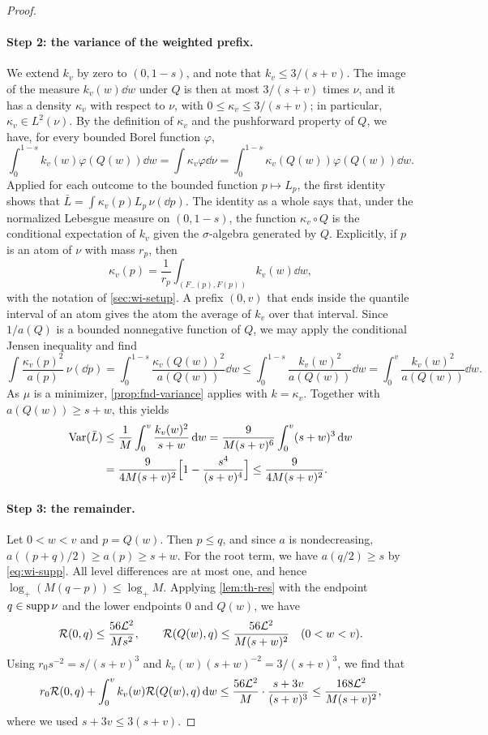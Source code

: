 \begin{proof}
\paragraph{Step 2: the variance of the weighted prefix.}
We extend $k_v$ by zero to $(0,1-s)$, and note that $k_v\le3/(s+v)$.
The image of the measure $k_v(w)\dd w$ under $Q$ is then at most
$3/(s+v)$ times $\nu$, and it has a density $\kappa_v$ with respect to
$\nu$, with $0\le\kappa_v\le3/(s+v)$; in particular,
$\kappa_v\in L^2(\nu)$. By the definition of $\kappa_v$ and the pushforward property of $Q$, we have,
for every bounded Borel function $\varphi$,
\[
 \int_0^{1-s}k_v(w)\varphi(Q(w))\dd w=\int\kappa_v\varphi\dd\nu
 =\int_0^{1-s}\kappa_v(Q(w))\varphi(Q(w))\dd w .
\]
Applied for each outcome to the bounded function $p\mapsto L_p$, the
first identity shows that $\bar L=\int\kappa_v(p)L_p\,\nu(\dd p)$. The identity as a whole says
that, under the normalized Lebesgue measure on $(0,1-s)$, the function
$\kappa_v\circ Q$ is the conditional expectation of $k_v$ given the
$\sigma$-algebra generated by $Q$. Explicitly, if $p$ is an atom of
$\nu$ with mass $r_p$, then
\[
 \kappa_v(p)=\frac1{r_p}\int_{(F_-(p),F(p))}k_v(w)\dd w,
\]
with the notation of \cref{sec:wi-setup}. A prefix $(0,v)$ that ends
inside the quantile interval of an atom gives the atom the average
of $k_v$ over that interval. Since $1/a(Q)$ is a bounded nonnegative
function of $Q$, we may apply the conditional Jensen inequality and find
\[
 \int\frac{\kappa_v(p)^2}{a(p)}\,\nu(\dd p)
 =\int_0^{1-s}\frac{\kappa_v(Q(w))^2}{a(Q(w))}\dd w
 \le\int_0^{1-s}\frac{k_v(w)^2}{a(Q(w))}\dd w
 =\int_0^v\frac{k_v(w)^2}{a(Q(w))}\dd w .
\]
As $\mu$ is a minimizer, \cref{prop:fnd-variance} applies with
$k=\kappa_v$. Together with $a(Q(w))\ge s+w$, this yields
\[
 \begin{aligned}
 \operatorname{Var}(\bar L)
 &\le\frac1M\int_0^v\frac{k_v(w)^2}{s+w}\,\mathrm d w
 =\frac9{M(s+v)^6}\int_0^v(s+w)^3\,\mathrm d w\\
 &=\frac9{4M(s+v)^2}\Bigl[1-\frac{s^4}{(s+v)^4}\Bigr]
 \le\frac9{4M(s+v)^2}.
 \end{aligned}
\]

\paragraph{Step 3: the remainder.}
Let $0<w<v$ and $p=Q(w)$. Then $p\le q$, and since $a$ is
nondecreasing, $a((p+q)/2)\ge a(p)\ge s+w$. For the root term, we have
$a(q/2)\ge s$ by \eqref{eq:wi-supp}. All level differences are at most
one, and hence $\log_+(M(q-p))\le\log_+M$. Applying \cref{lem:th-res}
with the endpoint $q\in\operatorname{supp}\nu$ and the lower endpoints $0$ and $Q(w)$, we have
\[
 \mathcal R(0,q)\le\frac{56\mathcal L^2}{Ms^2},\qquad
 \mathcal R(Q(w),q)\le\frac{56\mathcal L^2}{M(s+w)^2}\quad(0<w<v).
\]
Using $r_0s^{-2}=s/(s+v)^3$ and $k_v(w)(s+w)^{-2}=3/(s+v)^3$, we find
that
\[
 r_0\mathcal R(0,q)+\int_0^vk_v(w)\mathcal R(Q(w),q)\,\mathrm d w
 \le\frac{56\mathcal L^2}{M}\cdot\frac{s+3v}{(s+v)^3}
 \le\frac{168\mathcal L^2}{M(s+v)^2},
\]
where we used $s+3v\le3(s+v)$.


\end{proof}
